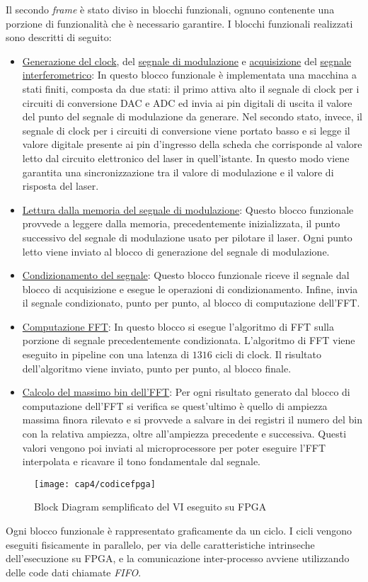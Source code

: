 Il secondo \textit{frame} è stato diviso in blocchi funzionali, ognuno contenente una porzione di funzionalità che è necessario garantire. I blocchi funzionali realizzati sono descritti di seguito:
\begin{itemize}
	\item \underline{Generazione del clock}, del \underline{segnale di modulazione} e \underline{acquisizione} del \underline{segnale interferometrico}: In questo blocco funzionale è implementata una macchina a stati finiti, composta da due stati: il primo attiva alto il segnale di clock per i circuiti di conversione DAC e ADC ed invia ai pin digitali di uscita il valore del punto del segnale di modulazione da generare. Nel secondo stato, invece, il segnale di clock per i circuiti di conversione viene portato basso e si legge il valore digitale presente ai pin d'ingresso della scheda che corrisponde al valore letto dal circuito elettronico del laser in quell'istante. In questo modo viene garantita una sincronizzazione tra il valore di modulazione e il valore di risposta del laser.
	\item \underline{Lettura dalla memoria del segnale di modulazione}: Questo blocco funzionale provvede a leggere dalla memoria, precedentemente inizializzata, il punto successivo del segnale di modulazione usato per pilotare il laser. Ogni punto letto viene inviato al blocco di generazione del segnale di modulazione.
	\item \underline{Condizionamento del segnale}: Questo blocco funzionale riceve il segnale dal blocco di acquisizione e esegue le operazioni di condizionamento. Infine, invia il segnale condizionato, punto per punto, al blocco di computazione dell'FFT.
	\item \underline{Computazione FFT}: In questo blocco si esegue l'algoritmo di FFT sulla porzione di segnale precedentemente condizionata. L'algoritmo di FFT viene eseguito in pipeline con una latenza di $1316$ cicli di clock. Il risultato dell'algoritmo viene inviato, punto per punto, al blocco finale.
	\item \underline{Calcolo del massimo bin dell'FFT}: Per ogni risultato generato dal blocco di computazione dell'FFT si verifica se quest'ultimo è quello di ampiezza massima finora rilevato e si provvede a salvare in dei registri il numero del bin con la relativa ampiezza, oltre all'ampiezza precedente e successiva. Questi valori vengono poi inviati al microprocessore per poter eseguire l'FFT interpolata e ricavare il tono fondamentale dal segnale.
\end{itemize}
\begin{figure}
	\begin{center}
		\texttt{[image: cap4/codicefpga]}
		\caption{Block Diagram semplificato del VI eseguito su FPGA}
		\label{codicefpga}
	\end{center}
\end{figure}
Ogni blocco funzionale è rappresentato graficamente da un ciclo. I cicli vengono eseguiti fisicamente in parallelo, per via delle caratteristiche intrinseche dell'esecuzione su FPGA, e la comunicazione inter-processo avviene utilizzando delle code dati chiamate \textit{FIFO}. 


